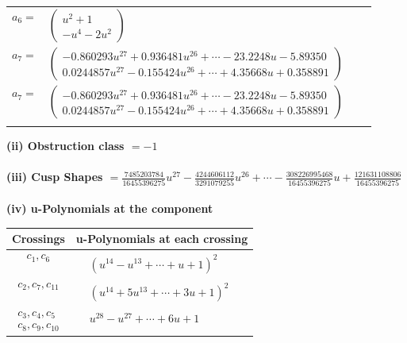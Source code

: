 \documentclass[1p]{elsarticle_modified}
\theoremstyle{definition}
\begin{document}
\begin{tabular}{m{7pt} m{180pt} m{7pt} m{180pt} }
\flushright $a_{6}=$&$\begin{pmatrix}u^2+1\\- u^4-2 u^2\end{pmatrix}$ \\
\flushright $a_{7}=$&$\begin{pmatrix}-0.860293 u^{27}+0.936481 u^{26}+\cdots-23.2248 u-5.89350\\0.0244857 u^{27}-0.155424 u^{26}+\cdots+4.35668 u+0.358891\end{pmatrix}$\\ \flushright $a_{7}=$&$\begin{pmatrix}-0.860293 u^{27}+0.936481 u^{26}+\cdots-23.2248 u-5.89350\\0.0244857 u^{27}-0.155424 u^{26}+\cdots+4.35668 u+0.358891\end{pmatrix}$\\&\end{tabular}
\flushleft \textbf{(ii) Obstruction class $= -1$}\\~\\
\flushleft \textbf{(iii) Cusp Shapes $= \frac{7485203784}{16455396275} u^{27}-\frac{4244606112}{3291079255} u^{26}+\cdots-\frac{308226995468}{16455396275} u+\frac{121631108806}{16455396275}$}\\~\\
\newpage\renewcommand{\arraystretch}{1}
\flushleft \textbf{(iv) u-Polynomials at the component}\newline \\
\begin{tabular}{m{50pt}|m{274pt}}
Crossings & \hspace{64pt}u-Polynomials at each crossing \\
\hline $$\begin{aligned}c_{1},c_{6}\end{aligned}$$&$\begin{aligned}
&(u^{14}- u^{13}+\cdots+u+1)^{2}
\end{aligned}$\\
\hline $$\begin{aligned}c_{2},c_{7},c_{11}\end{aligned}$$&$\begin{aligned}
&(u^{14}+5 u^{13}+\cdots+3 u+1)^{2}
\end{aligned}$\\
\hline $$\begin{aligned}c_{3},c_{4},c_{5}\\c_{8},c_{9},c_{10}\end{aligned}$$&$\begin{aligned}
&u^{28}- u^{27}+\cdots+6 u+1
\end{aligned}$\\
\hline
\end{tabular}\\~\\
\end{document}
